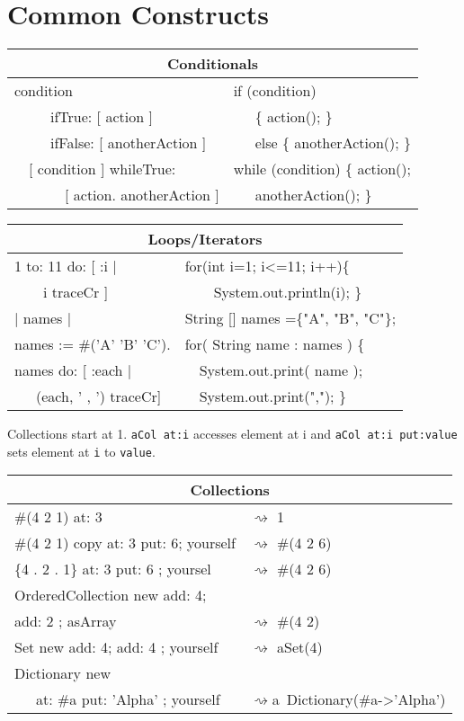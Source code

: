 \documentclass[notumble]{leaflet}
\newcommand{\ct}[1]{{\textsf{#1}}\xspace}
\newcommand{\code}[1]{\foreignlanguage{english}{\texttt{#1}}}
\begin{document}
\vspace{-0.3cm}
\section{Common Constructs}

\noindent
\begin{tabularx}{\linewidth}{@{}lX@{}}
        \toprule
        \multicolumn{2}{c}{\textbf{Conditionals}}\\
        \midrule
        
condition&if (condition) \\
\ \ \ \ \    ifTrue: [ action ] &      \ \ \   \{ action(); \} \\
\ \ \ \ \  ifFalse: [ anotherAction ]&   \ \ \     else \{ anotherAction(); \}\\
\midrule
\ \  [ condition ] whileTrue:&while (condition) \{ action();\\
\ \ \ \ \ \ \  [ action. anotherAction ]&\ \ \     anotherAction(); \}\\
\end{tabularx}

\noindent
\begin{tabularx}{\linewidth}{@{}lX@{}}
        \toprule
        \multicolumn{2}{c}{\textbf{Loops/Iterators}}\\
\midrule
1 to: 11 do: [ :i | &for(int i=1; i<=11; i++)\{ \\
\ \ \ \  i traceCr ]&\ \ \ \    System.out.println(i); \}\\
  \midrule
| names | &String [] names =\{"A", "B", "C"\};\\  
names := \#('A' 'B' 'C').&for( String name : names ) \{\\
names do: [ :each |&\ \      System.out.print( name );\\
 \ \ \ (each, ' , ') traceCr]&\ \     System.out.print(","); \} \\
\midrule
\end{tabularx}

Collections start at 1. \code{aCol~at:i} accesses element at \ct{i} and \code{aCol at:i put:value} sets element at \code{i} to \code{value}.

\noindent
\begin{tabularx}{\linewidth}{@{}lX@{}}
     \toprule
      \multicolumn{2}{c}{\textbf{Collections}}\\
      \midrule
    \#(4 2 1) at: 3& $\rightsquigarrow$ 1 \\
   \#(4 2 1) copy at: 3 put: 6; yourself& $\rightsquigarrow$ \#(4 2 6) \\
   \{4 . 2 . 1\} at: 3 put: 6 ; yoursel& $\rightsquigarrow$ \#(4 2 6) \\
     \midrule
    OrderedCollection new add: 4; \\    add: 2 ; asArray& $\rightsquigarrow$ \#(4 2) \\
    Set new add: 4; add: 4 ; yourself&$\rightsquigarrow$ aSet(4) \\
    Dictionary new& \\
    \ \ \ at: \#a put: 'Alpha' ; yourself&$\rightsquigarrow$a~Dictionary(\#a->'Alpha')\\
     \midrule
\end{tabularx}
\end{document}
